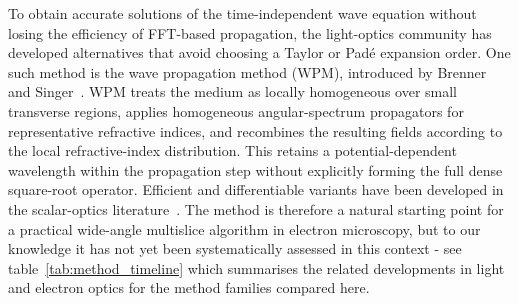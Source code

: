\documentclass[preprint,12pt,number]{elsarticle}
\begin{document}
To obtain accurate solutions of the time-independent wave equation without
losing the efficiency of FFT-based propagation, the light-optics community has
developed alternatives that avoid choosing a Taylor or Pad\'e expansion order.
One such method is the wave propagation method (WPM), introduced by Brenner and
Singer~\cite{Brenner1993}. WPM treats the medium as locally homogeneous over
small transverse regions, applies homogeneous angular-spectrum propagators for
representative refractive indices, and recombines the resulting fields
according to the local refractive-index distribution. This retains a
potential-dependent wavelength within the propagation step without explicitly
forming the full dense square-root operator. Efficient and differentiable
variants have been developed in the scalar-optics
literature~\cite{Schmidt2016,BarreBrunel2025}.
The method is therefore a natural starting point for a practical wide-angle
multislice algorithm in electron microscopy, but to our knowledge it has not
yet been systematically assessed in this context - see table~\ref{tab:method_timeline} which summarises the related developments in light
and electron optics for the method families compared here.
\end{document}
